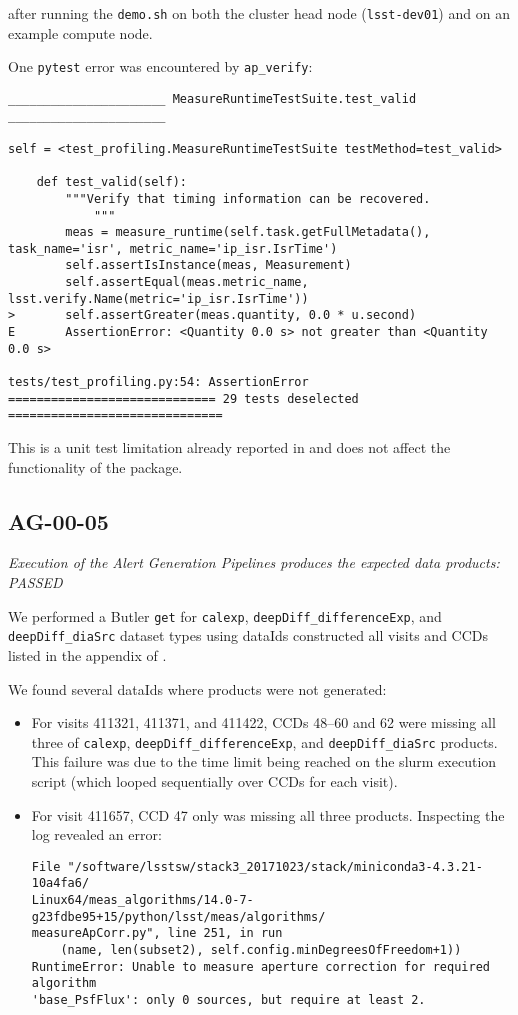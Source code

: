 \documentclass[DM,lsstdraft,STR,toc]{lsstdoc}
\begin{document}
after running the \texttt{demo.sh} on both the cluster head node (\texttt{lsst-dev01}) and on an example compute node.

One \texttt{pytest} error was encountered by \texttt{ap\_verify}:

\begin{verbatim}
______________________ MeasureRuntimeTestSuite.test_valid ______________________

self = <test_profiling.MeasureRuntimeTestSuite testMethod=test_valid>

    def test_valid(self):
        """Verify that timing information can be recovered.
            """
        meas = measure_runtime(self.task.getFullMetadata(), task_name='isr', metric_name='ip_isr.IsrTime')
        self.assertIsInstance(meas, Measurement)
        self.assertEqual(meas.metric_name, lsst.verify.Name(metric='ip_isr.IsrTime'))
>       self.assertGreater(meas.quantity, 0.0 * u.second)
E       AssertionError: <Quantity 0.0 s> not greater than <Quantity 0.0 s>

tests/test_profiling.py:54: AssertionError
============================= 29 tests deselected ==============================\end{verbatim}

This is a unit test limitation already reported in  and does not affect the functionality of the package.

\subsection{AG-00-05}
\label{sect:ag-00-05}

\textit{Execution of the Alert Generation Pipelines produces the expected data products: PASSED}

We performed a Butler \texttt{get} for \texttt{calexp}, \texttt{deepDiff\_differenceExp}, and \texttt{deepDiff\_diaSrc} dataset types using dataIds constructed all visits and CCDs listed in the appendix of .

We found several dataIds where products were not generated:

\begin{itemize}
    \item For visits 411321, 411371, and 411422, CCDs 48--60 and 62 were missing all three of \texttt{calexp}, \texttt{deepDiff\_differenceExp}, and \texttt{deepDiff\_diaSrc} products.  This failure was due to the time limit being reached on the slurm execution script (which looped sequentially over CCDs for each visit).
    \item For visit 411657, CCD 47 only was missing all three products.  Inspecting the log revealed an error:
        \begin{verbatim}
File "/software/lsstsw/stack3_20171023/stack/miniconda3-4.3.21-10a4fa6/
Linux64/meas_algorithms/14.0-7-g23fdbe95+15/python/lsst/meas/algorithms/
measureApCorr.py", line 251, in run
    (name, len(subset2), self.config.minDegreesOfFreedom+1))
RuntimeError: Unable to measure aperture correction for required algorithm
'base_PsfFlux': only 0 sources, but require at least 2.
\end{verbatim}
\end{itemize}
\end{document}
